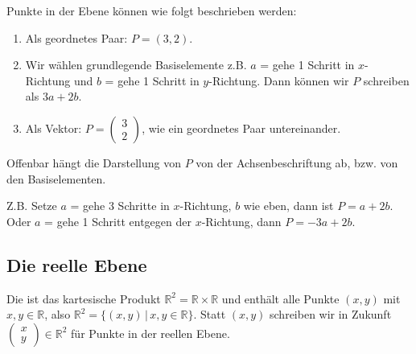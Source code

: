 \begin{center}
\end{center}

Punkte in der Ebene können wie folgt beschrieben werden:
\begin{enumerate}
	\item{Als geordnetes Paar: $P = (3, 2)$.}
	\item{Wir wählen \glqq{}grundlegende Basiselemente\grqq{} z.B. $a$ = \glqq{}gehe\grqq{} 1 Schritt in $x$-Richtung und $b$ = \glqq{}gehe\grqq{} 1 Schritt in $y$-Richtung. Dann können wir $P$ schreiben als $3a + 2b$.}
	\item{Als Vektor: $P = \begin{pmatrix}3 \\ 2\end{pmatrix}$, wie ein geordnetes Paar untereinander.}
\end{enumerate}

Offenbar hängt die Darstellung von $P$ von der Achsenbeschriftung ab, bzw. von den \glqq{}Basiselementen\grqq{}.

Z.B. Setze $a$ = \glqq{}gehe\grqq{} 3 Schritte in $x$-Richtung, $b$ wie eben, dann ist $P = a + 2b$. Oder $a$ = \glqq{}gehe\grqq{} 1 Schritt entgegen der $x$-Richtung, dann $P = -3a + 2b$.

\subsection{Die reelle Ebene}
Die  ist das kartesische Produkt $\mathbb{R}^2 = \mathbb{R} \times \mathbb{R}$ und enthält alle Punkte $(x, y)$ mit $x, y \in \mathbb{R}$, also $\mathbb{R}^2 = \{(x,y)\,|\,x,y \in \mathbb{R}\}$. Statt $(x, y)$ schreiben wir in Zukunft $\begin{pmatrix}x \\ y\end{pmatrix} \in \mathbb{R}^2$ für Punkte in der reellen Ebene.

